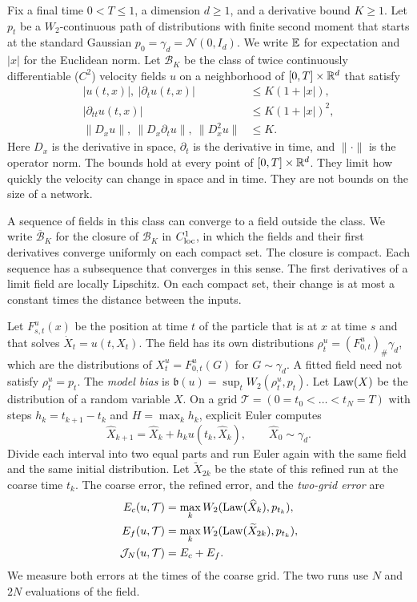 Fix a final time $0<T\le1$, a dimension $d\ge1$, and a derivative bound
$K\ge1$. Let $p_t$ be a $W_2$-continuous path of distributions with
finite second moment that starts at the standard Gaussian
$p_0=\gamma_d=\mathcal N(0,I_d)$. We write $\mathbb E$ for expectation and
$|x|$ for the Euclidean norm. Let $\mathcal B_K$ be the class of twice
continuously differentiable ($C^2$) velocity fields $u$ on a
neighborhood of $[0,T]\times\mathbb R^d$ that satisfy
\begin{equation}
\begin{aligned}
 |u(t,x)|,\ |\partial_tu(t,x)|&\le K(1+|x|),\\
 |\partial_{tt}u(t,x)|&\le K(1+|x|)^2,\\
 \|D_xu\|,\ \|D_x\partial_tu\|,\ \|D_x^2u\|&\le K.
\end{aligned}
\label{eq:budget}
\end{equation}
Here $D_x$ is the derivative in space, $\partial_t$ is the derivative in
time, and $\|\cdot\|$ is the operator norm. The bounds hold at every
point of $[0,T]\times\mathbb R^d$. They limit how quickly the velocity can
change in space and in time. They are not bounds on the size of a
network.

A sequence of fields in this class can converge to a field outside the
class. We write $\overline{\mathcal B}_K$ for the closure of
$\mathcal B_K$ in $C^1_{\rm loc}$, in which the fields and their first
derivatives converge uniformly on each compact set. The closure is compact. Each sequence has a subsequence that converges
in this sense. The first derivatives of a limit field are locally
Lipschitz. On each compact set, their change is at most a constant
times the distance between the inputs.

Let $F^u_{s,t}(x)$ be the position at time $t$ of the particle that is
at $x$ at time $s$ and that solves $\dot X_t=u(t,X_t)$. The field has
its own distributions $\rho_t^u=(F^u_{0,t})_\#\gamma_d$, which are the
distributions of $X_t^u=F^u_{0,t}(G)$ for $G\sim\gamma_d$. A fitted
field need not satisfy $\rho_t^u=p_t$. The \emph{model bias} is
$\mathfrak b(u)=\sup_tW_2(\rho_t^u,p_t)$. Let $\operatorname{Law}(X)$ be the
distribution of a random variable $X$. On a grid
$\mathcal T=(0=t_0<\dots<t_N=T)$ with steps $h_k=t_{k+1}-t_k$ and
$H=\max_kh_k$, explicit Euler computes
\[
 \widehat X_{k+1}=\widehat X_k+h_ku(t_k,\widehat X_k),\qquad
 \widehat X_0\sim\gamma_d.
\]
Divide each interval into two equal parts and run Euler again with the
same field and the same initial distribution. Let $\widetilde X_{2k}$ be
the state of this refined run at the coarse time $t_k$. The coarse
error, the refined error, and the \emph{two-grid error} are
\begin{align}
 E_c(u,\mathcal T)&=\max_kW_2(\operatorname{Law}(\widehat X_k),p_{t_k}),\notag\\
 E_f(u,\mathcal T)&=\max_kW_2(\operatorname{Law}(\widetilde X_{2k}),p_{t_k}),\label{eq:errors}\\
 \mathcal J_N(u,\mathcal T)&=E_c+E_f.\notag
\end{align}
We measure both errors at the times of the coarse grid. The two runs use
$N$ and $2N$ evaluations of the field.

